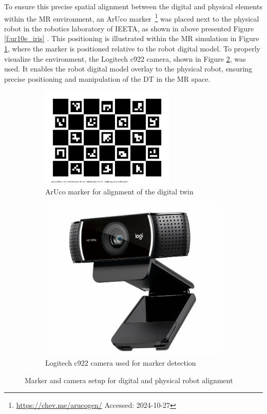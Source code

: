 To ensure this precise spatial alignment between the digital and physical elements within the \ac{MR} environment, an ArUco marker~\footnote{\url{https://chev.me/arucogen/} Accessed: 2024-10-27} was placed next to the physical robot in the robotics laboratory of IEETA, as shown in above presented Figure \ref{f:ur10e_iris} . This positioning is illustrated within the \ac{MR} simulation in Figure \ref{f:aruco_marker}, where the marker is positioned relative to the robot digital model. To properly visualize the environment, the Logitech c922 camera, shown in Figure \ref{fig:camera-c922}, was used. It enables the robot digital model overlay to the physical robot, ensuring precise positioning and manipulation of the \ac{DT} in the \ac{MR} space.

\begin{figure}[h]
    \centering
    \begin{subfigure}[b]{0.45\textwidth}
    \centering
    \includegraphics[width=0.7\textwidth]{figs/calib_io_charuco_200x150_5x7_25_18_DICT_4X4.png}
    \caption{ArUco marker for alignment of the digital twin}
    \label{f:aruco_marker}
    \end{subfigure}
        \hfill
    \begin{subfigure}[b]{0.45\textwidth}
        \centering
        \includegraphics[width=0.7\linewidth]{figs/camera-c922.jpg}
        \caption{Logitech c922 camera used for marker detection}
        \label{fig:camera-c922}
    \end{subfigure}
    \caption{Marker and camera setup for digital and physical robot alignment}
\label{marker-camera}
\end{figure}

